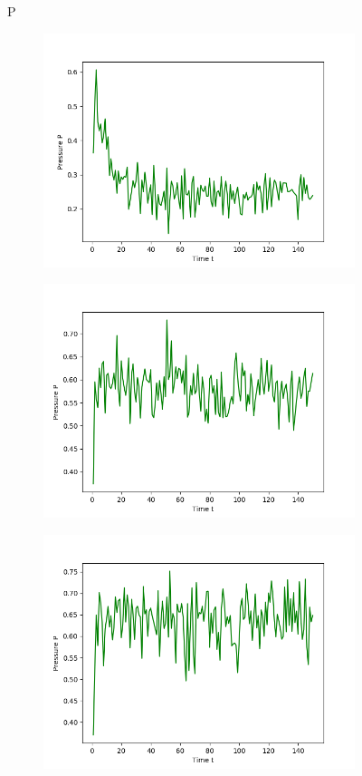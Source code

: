 \begin{figure}[ht]
P
\hfill
\begin{subfigure}{0.3\textwidth}
\includegraphics[width=\textwidth]{../dat/Pressure_T0d3.png}
\end{subfigure}
\hfill
\begin{subfigure}{0.3\textwidth}
\includegraphics[width=\textwidth]{../dat/Pressure_T1d0.png}
\end{subfigure}
\hfill
\begin{subfigure}{0.3\textwidth}
\includegraphics[width=\textwidth]{../dat/Pressure_T2d0.png}

\end{subfigure}
\end{figure}
